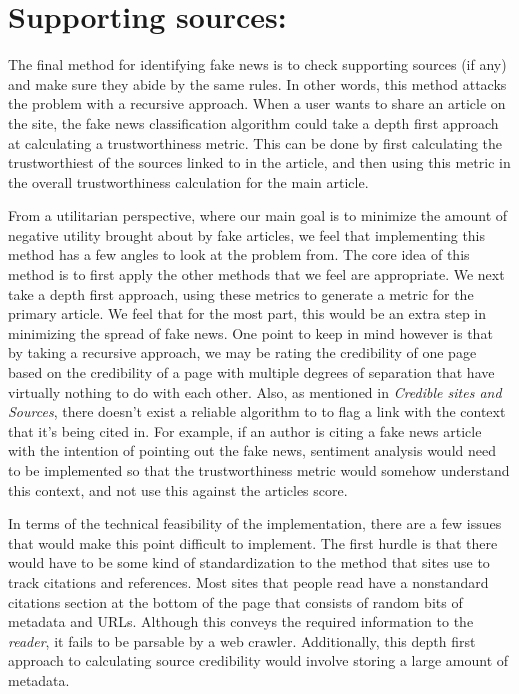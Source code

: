 \documentclass[12pt]{article}
\begin{document}
\section{Supporting sources:}
The final method for identifying fake news is to check supporting sources (if any) and make sure they abide by the same rules. In other words, this method attacks the problem with a recursive approach. When a user wants to share an article on the site, the fake news classification algorithm could take a depth first approach at calculating a trustworthiness metric. This can be done by first calculating the trustworthiest of the sources linked to in the article, and then using this metric in the overall trustworthiness calculation for the main article.

From a utilitarian perspective, where our main goal is to minimize the amount of negative utility brought about by fake articles, we feel that implementing this method has a few angles to look at the problem from. The core idea of this method is to first apply the other methods that we feel are appropriate. We next take a depth first approach, using these metrics to generate a metric for the primary article. We feel that for the most part, this would be an extra step in minimizing the spread of fake news. One point to keep in mind however is that by taking a recursive approach, we may be rating the credibility of one page based on the credibility of a page with multiple degrees of separation that have virtually nothing to do with each other. Also, as mentioned in \textit{Credible sites and Sources}, there doesn't exist a reliable algorithm to to flag a link with the context that it's being cited in. For example, if an author is citing a fake news article with the intention of pointing out the fake news, sentiment analysis would need to be implemented so that the trustworthiness metric would somehow understand this context, and not use this against the articles score.

In terms of the technical feasibility of the implementation, there are a few issues that would make this point difficult to implement. The first hurdle is that there would have to be some kind of standardization to the method that sites use to track citations and references. Most sites that people read have a nonstandard citations section at the bottom of the page that consists of random bits of metadata and URLs. Although this conveys the required information to the \textit{reader}, it fails to be parsable by a web crawler. Additionally, this depth first approach to calculating source credibility would involve storing a large amount of metadata.
\end{document}
